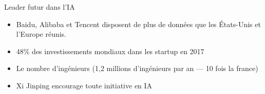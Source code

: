 
\begin{frame}{Leader futur dans l'IA}
  \begin{itemize}
    \item Baidu, Alibaba et Tencent disposent de plus de données que les États-Unis et l’Europe réunis.
    \item 48\% des investissements mondiaux dans les startup en 2017
    \item Le nombre d'ingénieurs (1,2 millions d'ingénieurs par an --- 10 fois la france)
    \item Xi Jinping encourage toute initiative en IA
  \end{itemize}
\end{frame}
